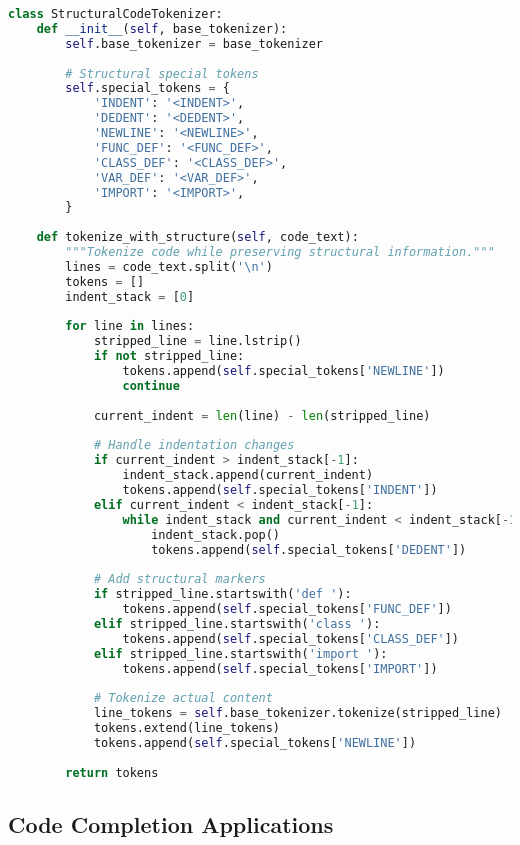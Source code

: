 \begin{lstlisting}[language=Python, caption=Structure-aware code tokenization]
class StructuralCodeTokenizer:
    def __init__(self, base_tokenizer):
        self.base_tokenizer = base_tokenizer
        
        # Structural special tokens
        self.special_tokens = {
            'INDENT': '<INDENT>',
            'DEDENT': '<DEDENT>',
            'NEWLINE': '<NEWLINE>',
            'FUNC_DEF': '<FUNC_DEF>',
            'CLASS_DEF': '<CLASS_DEF>',
            'VAR_DEF': '<VAR_DEF>',
            'IMPORT': '<IMPORT>',
        }
        
    def tokenize_with_structure(self, code_text):
        """Tokenize code while preserving structural information."""
        lines = code_text.split('\n')
        tokens = []
        indent_stack = [0]
        
        for line in lines:
            stripped_line = line.lstrip()
            if not stripped_line:
                tokens.append(self.special_tokens['NEWLINE'])
                continue
            
            current_indent = len(line) - len(stripped_line)
            
            # Handle indentation changes
            if current_indent > indent_stack[-1]:
                indent_stack.append(current_indent)
                tokens.append(self.special_tokens['INDENT'])
            elif current_indent < indent_stack[-1]:
                while indent_stack and current_indent < indent_stack[-1]:
                    indent_stack.pop()
                    tokens.append(self.special_tokens['DEDENT'])
            
            # Add structural markers
            if stripped_line.startswith('def '):
                tokens.append(self.special_tokens['FUNC_DEF'])
            elif stripped_line.startswith('class '):
                tokens.append(self.special_tokens['CLASS_DEF'])
            elif stripped_line.startswith('import '):
                tokens.append(self.special_tokens['IMPORT'])
            
            # Tokenize actual content
            line_tokens = self.base_tokenizer.tokenize(stripped_line)
            tokens.extend(line_tokens)
            tokens.append(self.special_tokens['NEWLINE'])
        
        return tokens
\end{lstlisting}

\subsection{Code Completion Applications}

